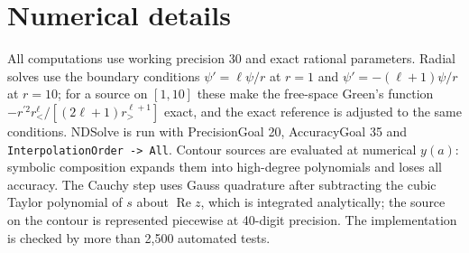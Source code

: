 \documentclass[aps,prd,twocolumn,superscriptaddress,nofootinbib,floatfix]{revtex4-2}
\renewcommand{\Re}{\operatorname{Re}}
\begin{document}
\section{Numerical details}\label{app:numerics}
All computations use working precision 30 and exact rational parameters.
Radial solves use the boundary conditions $\psi'=\ell\psi/r$ at $r=1$ and $\psi'=-(\ell+1)\psi/r$ at $r=10$; for a source on $[1,10]$ these make the free-space Green's function $-r^{\prime2}r_<^\ell/[(2\ell+1)r_>^{\ell+1}]$ exact, and the exact reference is adjusted to the same conditions.
NDSolve is run with PrecisionGoal 20, AccuracyGoal 35 and \texttt{InterpolationOrder -> All}.
Contour sources are evaluated at numerical $y(a)$: symbolic composition expands them into high-degree polynomials and loses all accuracy.
The Cauchy step uses Gauss quadrature after subtracting the cubic Taylor polynomial of $s$ about $\Re z$, which is integrated analytically; the source on the contour is represented piecewise at 40-digit precision.
The implementation is checked by more than 2,500 automated tests.
\end{document}
